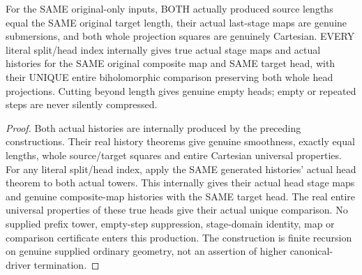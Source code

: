 \begin{theorem}
\label{hir:submersion-tower-composition-every-literal-head}
\leanok
{}
For the SAME original-only inputs, BOTH actually produced source lengths
equal the SAME original target length, their actual last-stage maps are
genuine submersions, and both whole projection squares are genuinely
Cartesian. EVERY literal split/head index internally gives true actual
stage maps and actual histories for the SAME original composite map and
SAME target head, with their UNIQUE entire biholomorphic comparison preserving
both whole head projections. Cutting beyond length gives genuine empty
heads; empty or repeated steps are never silently compressed.
\end{theorem}
\begin{proof}
Both actual histories are internally produced by the preceding constructions.
Their real history theorems give genuine smoothness, exactly equal lengths,
whole source/target squares and entire Cartesian universal properties.
For any literal split/head index, apply the SAME generated histories' actual
head theorem to both actual towers. This internally gives their actual
head stage maps and genuine composite-map histories with the SAME target
head. The real entire universal properties of these true heads give their
actual unique comparison. No supplied prefix tower, empty-step suppression,
stage-domain identity, map or comparison certificate enters this production.
The construction is finite recursion on genuine supplied ordinary geometry,
not an assertion of higher canonical-driver termination.
\end{proof}

